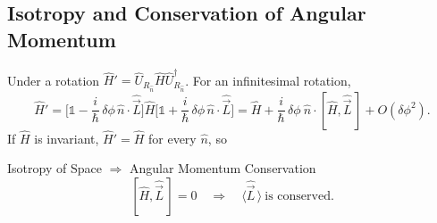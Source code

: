 \documentclass[11pt,a4paper]{article}
\begin{document}
\subsection{Isotropy and Conservation of Angular Momentum}
Under a rotation $\hat H'=\hat U_{R_{\hat n}}\hat H\hat U_{R_{\hat n}}^\dagger$. For an infinitesimal rotation,
\[
\hat H'=\Big[\mathbb 1-\frac i\hbar\,\delta\phi\,\hat n\cdot\hat{\vec L}\Big]\hat H\Big[\mathbb 1+\frac i\hbar\,\delta\phi\,\hat n\cdot\hat{\vec L}\Big]=\hat H+\frac i\hbar\,\delta\phi\ \hat n\cdot[\hat H,\hat{\vec L}\,]+O(\delta\phi^2).
\]
If $\hat H$ is invariant, $\hat H'=\hat H$ for every $\hat n$, so
\begin{thm}{Isotropy of Space $\Rightarrow$ Angular Momentum Conservation}
\[
[\hat H,\hat{\vec L}\,]=0\quad\Longrightarrow\quad \langle\hat{\vec L}\,\rangle\ \text{is conserved.}
\]
\end{thm}
\end{document}

